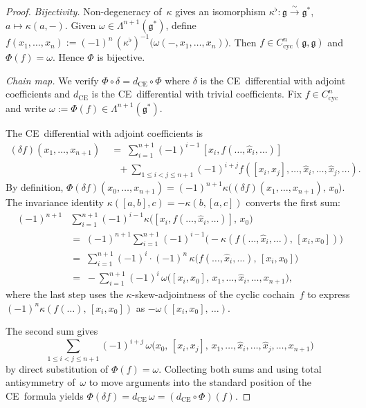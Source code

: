 \begin{proof}
\emph{Bijectivity.}
Non-degeneracy of~$\kappa$ gives an isomorphism
$\kappa^\flat\colon \mathfrak{g}\xrightarrow{\sim}\mathfrak{g}^*$,
$a\mapsto \kappa(a,-)$.  Given
$\omega\in\Lambda^{n+1}(\mathfrak{g}^*)$, define
$f(x_1,\ldots,x_n) :=
(-1)^n\,(\kappa^\flat)^{-1}\bigl(\omega(-,x_1,\ldots,x_n)\bigr)$.
Then $f\in C^n_{\mathrm{cyc}}(\mathfrak{g},\mathfrak{g})$
and $\Phi(f) = \omega$.  Hence $\Phi$ is bijective.

\emph{Chain map.}
We verify $\Phi\circ\delta = d_{\mathrm{CE}}\circ\Phi$ where
$\delta$ is the CE~differential with adjoint coefficients and
$d_{\mathrm{CE}}$ is the CE~differential with trivial
coefficients.  Fix $f\in C^n_{\mathrm{cyc}}$ and write
$\omega := \Phi(f)\in\Lambda^{n+1}(\mathfrak{g}^*)$.

The CE~differential with adjoint coefficients is
\[
\begin{aligned}
(\delta f)(x_1,\ldots,x_{n+1})
&\;=\;
\sum_{i=1}^{n+1}(-1)^{i-1}\,[x_i,f(\ldots,\widehat{x}_i,\ldots)]\\
&\quad+\!\!
\sum_{1\le i<j\le n+1}\!\!(-1)^{i+j}f([x_i,x_j],\ldots,
\widehat{x}_i,\ldots,\widehat{x}_j,\ldots).
\end{aligned}
\]
By definition,
$\Phi(\delta f)(x_0,\ldots,x_{n+1})
= (-1)^{n+1}\kappa\bigl((\delta f)(x_1,\ldots,x_{n+1}),\,x_0\bigr)$.
The invariance identity
$\kappa([a,b],c) = -\kappa(b,[a,c])$ converts the first sum:
\begin{align*}
(-1)^{n+1}
&\sum_{i=1}^{n+1}(-1)^{i-1}
\kappa\bigl([x_i,f(\ldots,\widehat{x}_i,\ldots)],\,x_0\bigr)\\
&=\;
(-1)^{n+1}\sum_{i=1}^{n+1}(-1)^{i-1}
\bigl(-\kappa(f(\ldots,\widehat{x}_i,\ldots),\,[x_i,x_0])\bigr)\\
&=\;
\sum_{i=1}^{n+1}(-1)^{i}
\cdot (-1)^n\,
\kappa\bigl(f(\ldots,\widehat{x}_i,\ldots),\,[x_i,x_0]\bigr)\\
&=\;
-\sum_{i=1}^{n+1}(-1)^{i}
\,\omega\bigl([x_i,x_0],\,x_1,\ldots,\widehat{x}_i,\ldots,
x_{n+1}\bigr),
\end{align*}
where the last step uses the $\kappa$-skew-adjointness of the
cyclic cochain~$f$ to express
$(-1)^n\kappa(f(\ldots),\,[x_i,x_0])$ as
$-\omega([x_i,x_0],\,\ldots)$.

The second sum gives
\[
\sum_{1\le i<j\le n+1}(-1)^{i+j}\,
\omega\bigl(x_0,\,[x_i,x_j],\,x_1,\ldots,
\widehat{x}_i,\ldots,\widehat{x}_j,\ldots,x_{n+1}\bigr)
\]
by direct substitution of $\Phi(f)=\omega$.  Collecting both sums
and using total antisymmetry of~$\omega$ to move arguments into
the standard position of the CE~formula yields
$\Phi(\delta f) = d_{\mathrm{CE}}\,\omega
= (d_{\mathrm{CE}}\circ\Phi)(f)$.
\end{proof}

